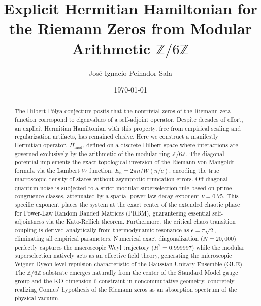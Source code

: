 \documentclass[prl,aps,floatfix,superscriptaddress,10pt]{revtex4-2}
\newcommand{\Zmod}{\mathbb{Z}/6\mathbb{Z}}
\begin{document}
\title{Explicit Hermitian Hamiltonian for the Riemann Zeros from Modular Arithmetic \texorpdfstring{$\Zmod$}{Z/6Z}}

\author{José Ignacio Peinador Sala }

\date{\today}

\begin{abstract}
The Hilbert-P\'olya conjecture posits that the nontrivial zeros of the Riemann zeta function correspond to eigenvalues of a self-adjoint operator. Despite decades of effort, an explicit Hermitian Hamiltonian with this property, free from empirical scaling and regularization artifacts, has remained elusive. Here we construct a manifestly Hermitian operator, $\hat{H}_{\text{mod}}$, defined on a discrete Hilbert space where interactions are governed exclusively by the arithmetic of the modular ring $\mathbb{Z}/6\mathbb{Z}$. The diagonal potential implements the exact topological inversion of the Riemann-von Mangoldt formula via the Lambert $W$ function, $E_n = 2\pi n / W(n/e)$, encoding the true macroscopic density of states without asymptotic truncation errors. Off-diagonal quantum noise is subjected to a strict modular superselection rule based on prime congruence classes, attenuated by a spatial power-law decay exponent $\nu = 0.75$. This specific exponent places the system at the exact center of the extended chaotic phase for Power-Law Random Banded Matrices (PRBM), guaranteeing essential self-adjointness via the Kato-Rellich theorem. Furthermore, the critical chaos transition coupling is derived analytically from thermodynamic resonance as $\epsilon = \pi \sqrt{2}$, eliminating all empirical parameters. Numerical exact diagonalization ($N=20,000$) perfectly captures the macroscopic Weyl trajectory ($R^2 = 0.999997$) while the modular superselection natively acts as an effective field theory, generating the microscopic Wigner-Dyson level repulsion characteristic of the Gaussian Unitary Ensemble (GUE). The $\Zmod$ substrate emerges naturally from the center of the Standard Model gauge group and the KO-dimension 6 constraint in noncommutative geometry, concretely realizing Connes' hypothesis of the Riemann zeros as an absorption spectrum of the physical vacuum.
\end{abstract}

\maketitle
\end{document}
